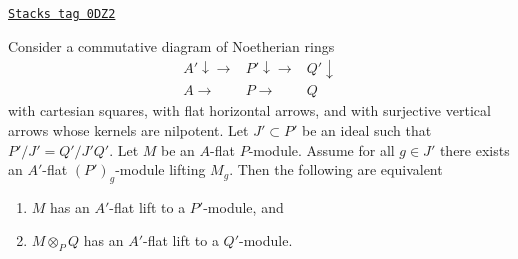 \begin{lemma}
\label{examples-defos-lemma-lift-equivalence-module}
\href{https://stacks.math.columbia.edu/tag/0DZ2}{\texttt{Stacks tag 0DZ2}}

Consider a commutative diagram of Noetherian rings
$$
\begin{array}{ccc}A' \downarrow\longrightarrow & P' \downarrow\longrightarrow & Q' \downarrow \\ A \longrightarrow & P \longrightarrow & Q\end{array}
$$
with cartesian squares, with flat horizontal arrows, and with
surjective vertical arrows whose kernels are nilpotent.
Let $J' \subset P'$ be an ideal such that $P'/J' = Q'/J'Q'$.
Let $M$ be an $A$-flat $P$-module.
Assume for all $g \in J'$ there exists an $A'$-flat $(P')_g$-module
lifting $M_g$. Then the following are equivalent
\begin{enumerate}
\item $M$ has an $A'$-flat lift to a $P'$-module, and
\item $M \otimes_P Q$ has an $A'$-flat lift to a $Q'$-module.
\end{enumerate}
\end{lemma}


